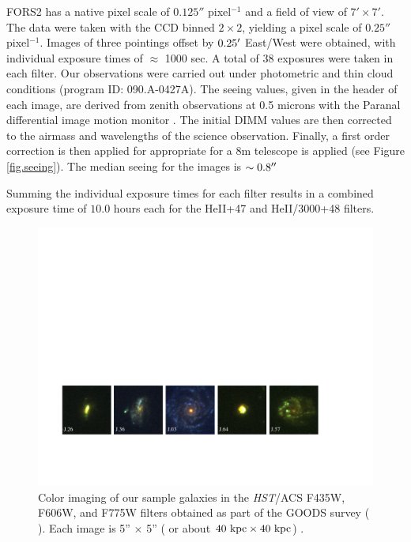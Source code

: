\documentclass[twocolumn]{aastex61}
\begin{document}
FORS2 has a native pixel scale of $0.125''$ pixel$^{-1}$ and a field of view of $7'\times7'$.  The data were taken with 
the CCD binned $2\times2$, yielding a pixel scale of $0.25''$ pixel$^{-1}$.
Images of three pointings offset by $0.25\mbox{$^\prime$}$ East/West were obtained, with individual exposure times of $\approx$ 1000 sec.  A total of 38  exposures were taken in each filter. 
Our observations were carried out under photometric and thin cloud conditions (program ID: 090.A-0427A). 
The seeing values, given in the header of each image, are derived from zenith observations at 0.5 microns with the Paranal differential image motion monitor \citep[DIMM,][]{Sarazin1990}. The initial DIMM values are then corrected to the airmass and wavelengths of the science observation. Finally, a first order correction is then applied for appropriate for a 8m telescope is applied (see Figure \ref{fig.seeing}). The median seeing for the images is $\sim 0.8\mbox{$^{\prime\prime}$}$

Summing the individual exposure times for each filter results in a combined exposure time of $10.0$ hours each for the HeII+47 and HeII/3000+48 filters.

\begin{figure}[!ht]
\centering
\includegraphics[scale=.75]{../Figures/fors2_color_imstamps.pdf}
\caption{Color imaging of our sample galaxies in the \emph{HST}/ACS F435W, F606W, and F775W filters obtained as part of the GOODS survey (\citeauthor{Giavalisco2004} \citeyear{Giavalisco2004}). Each image is 5'' $\times$ 5'' ( or about $ 40 \rm \ kpc \times 40 \rm \ kpc $) .\label{fig:hstims}}
\end{figure}
\end{document}
